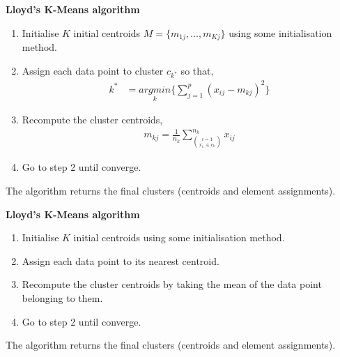 \documentclass[12pt]{article}
\begin{document}
\clearpage


\begin{center}
	\begin{tcolorbox}[breakable,colback=white!100!white,colframe=black!100!black]
		\noindent\textbf{Lloyd's K-Means algorithm}
		\begin{enumerate}
			\item Initialise $K$ initial centroids $M = \{m_{1j}, \dots, m_{Kj}\}$ using some initialisation method. 
			
			\item Assign each data point to cluster $c_{k^*}$ so that,
			\begin{align}\nonumber
			k^* &= \underset{k}{argmin}\bigg\{ \sum_{j=1}^{p} (x_{ij}-m_{kj})^2    \bigg\}
			\end{align}	
			
			\item Recompute the cluster centroids,
			\begin{align}\nonumber
			m_{kj} = \frac{1}{n_k}\sum_{\binom{i=1}{x_{i:} \in c_k}}^{n_k} x_{ij}
			\end{align}	
			
			\item Go to step 2 until converge.						
			
		\end{enumerate}	
		The algorithm returns the final clusters (centroids and element assignments).
	\end{tcolorbox}
\end{center}

\begin{center}
	\begin{tcolorbox}[breakable,colback=white!100!white,colframe=black!100!black]
		\noindent\textbf{Lloyd's K-Means algorithm}
		\begin{enumerate}
			\item Initialise $K$ initial centroids using some initialisation method. 
			
			\item Assign each data point to its nearest centroid. 
			
			\item Recompute the cluster centroids by taking the mean of the data point belonging to them.
			
			\item Go to step 2 until converge.						
			
		\end{enumerate}	
		The algorithm returns the final clusters (centroids and element assignments).
	\end{tcolorbox}
\end{center}
\end{document}
